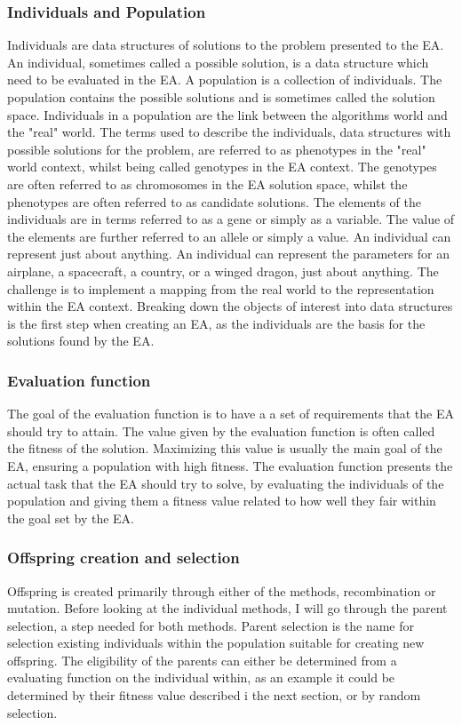 \documentclass[a4paper,11pt]{article}
\begin{document}
\subsubsection{Individuals and Population}
Individuals are data structures of solutions to the problem presented to the EA. An individual, sometimes called a possible solution, is a data structure which need to be evaluated in the EA. A population is a collection of individuals. The population contains the possible solutions and is sometimes called the solution space.  
Individuals in a population are the link between the algorithms world and the "real" world. The terms used to describe the individuals, data structures with possible solutions for the problem, are referred to as phenotypes in the "real" world context, whilst being called genotypes in the EA context.
The genotypes are often referred to as chromosomes in the EA solution space, whilst the phenotypes are often referred to as candidate solutions. The elements of the individuals are in terms referred to as a gene or simply as a variable. The value of the elements are further referred to an allele or simply a value. 
An individual can represent just about anything. An individual can represent the parameters for an airplane, a spacecraft, a country, or a winged dragon, just about anything. The challenge is to implement a mapping from the real world to the representation within the EA context. Breaking down the objects of interest into data structures is the first step when creating an EA, as the individuals are the basis for the solutions found by the EA. 

\subsubsection{Evaluation function}
The goal of the evaluation function is to have a a set of requirements that the EA should try to attain. The value given by the evaluation function is often called the fitness of the solution. Maximizing this value is usually the main goal of the EA, ensuring a population with high fitness. The evaluation function presents the actual task that the EA should try to solve, by evaluating the individuals of the population and giving them a fitness value related to how well they fair within the goal set by the EA.

\subsubsection{Offspring creation and selection}
Offspring is created primarily through either of the methods, recombination or mutation. Before looking at the individual methods, I will go through the parent selection, a step needed for both methods. 
Parent selection is the name for selection existing individuals within the population suitable for creating new offspring. The eligibility of the parents can either be determined from a evaluating function on the individual within, as an example it could be determined by their fitness value described i the next section, or by random selection.
\end{document}
